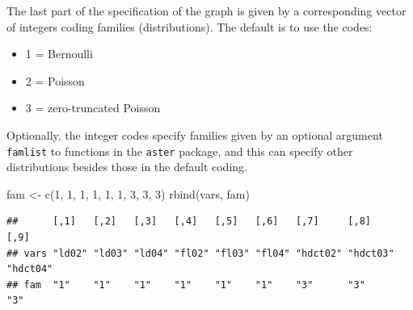 \documentclass[
  ignorenonframetext,
]{beamer}
\newenvironment{Shaded}{\begin{snugshade}}{\end{snugshade}}
\newcommand{\DecValTok}[1]{\textcolor[rgb]{0.00,0.00,0.81}{#1}}
\newcommand{\FunctionTok}[1]{\textcolor[rgb]{0.00,0.00,0.00}{#1}}
\newcommand{\NormalTok}[1]{#1}
\newcommand{\OtherTok}[1]{\textcolor[rgb]{0.56,0.35,0.01}{#1}}
\providecommand{\tightlist}{%
  \setlength{\itemsep}{0pt}\setlength{\parskip}{0pt}}
\begin{document}
\begin{frame}{}
\protect\hypertarget{section-11}{}
The last part of the specification of the graph is given by a
corresponding vector of integers coding families (distributions). The
default is to use the codes:

\begin{itemize}
\tightlist
\item
  1 = Bernoulli
\item
  2 = Poisson
\item
  3 = zero-truncated Poisson
\end{itemize}
\end{frame}

\begin{frame}[fragile]{}
\protect\hypertarget{section-12}{}
Optionally, the integer codes specify families given by an optional
argument \texttt{famlist} to functions in the \texttt{aster} package,
and this can specify other distributions besides those in the default
coding.

\vspace{12pt}
\tiny

\begin{Shaded}
\begin{Highlighting}[]
\NormalTok{fam }\OtherTok{\textless{}{-}} \FunctionTok{c}\NormalTok{(}\DecValTok{1}\NormalTok{, }\DecValTok{1}\NormalTok{, }\DecValTok{1}\NormalTok{, }\DecValTok{1}\NormalTok{, }\DecValTok{1}\NormalTok{, }\DecValTok{1}\NormalTok{, }\DecValTok{3}\NormalTok{, }\DecValTok{3}\NormalTok{, }\DecValTok{3}\NormalTok{)}
\FunctionTok{rbind}\NormalTok{(vars, fam)}
\end{Highlighting}
\end{Shaded}

\begin{verbatim}
##      [,1]   [,2]   [,3]   [,4]   [,5]   [,6]   [,7]     [,8]     [,9]    
## vars "ld02" "ld03" "ld04" "fl02" "fl03" "fl04" "hdct02" "hdct03" "hdct04"
## fam  "1"    "1"    "1"    "1"    "1"    "1"    "3"      "3"      "3"
\end{verbatim}
\end{frame}
\end{document}
